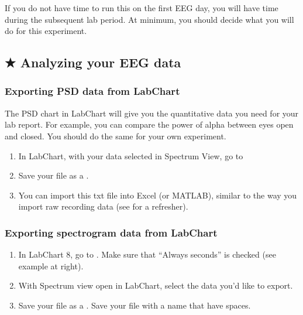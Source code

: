 \documentclass[letterpaper,10pt,english]{jupyterBook}
\begin{document}
\sphinxAtStartPar
{} If you do not have time to run this on the first EEG day, you will have time during the subsequent lab period. At minimum, you should decide what you will do for this experiment.


\subsection{★ Analyzing your EEG data}
\label{\detokenize{EEG:analyzing-your-eeg-data}}

\subsubsection{Exporting PSD data from LabChart}
\label{\detokenize{EEG:exporting-psd-data-from-labchart}}
\sphinxAtStartPar
The PSD chart in LabChart will give you the quantitative data you need for your lab report. For example, you can compare the power of alpha between eyes open and closed. You should do the same for your own experiment.
\begin{enumerate}
%
\item {} 
\sphinxAtStartPar
In LabChart, with your data selected in Spectrum View, go to 

\item {} 
\sphinxAtStartPar
Save your file as a .

\item {} 
\sphinxAtStartPar
You can import this txt file into Excel (or MATLAB), similar to the way you import raw recording data (see  for a refresher).

\end{enumerate}


\subsubsection{Exporting spectrogram data from LabChart}
\label{\detokenize{EEG:exporting-spectrogram-data-from-labchart}}
\sphinxAtStartPar
{}
\begin{enumerate}
%
\item {} 
\sphinxAtStartPar
In LabChart 8, go to . Make sure that “Always seconds” is checked (see example at right).

\item {} 
\sphinxAtStartPar
With Spectrum view open in LabChart, select the data you’d like to export.

\item {} 
\sphinxAtStartPar
Save your file as a . Save your file with a name that  have spaces.

\end{enumerate}
\end{document}
